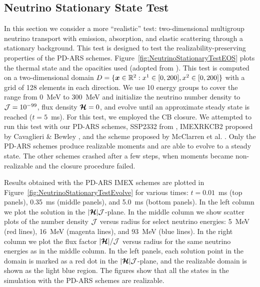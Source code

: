 \subsection{Neutrino Stationary State Test} \label{se: Neutrino Stationary State Test}

In this section we consider a more ``realistic'' test: two-dimensional multigroup neutrino transport with emission, absorption, and elastic scattering through a stationary background.  
This test is designed to test the realizability-preserving properties of the PD-ARS schemes.  
Figure~\ref{fig:NeutrinoStationaryTestEOS} plots the thermal state and the opacities used (adopted from \cite{Bruenn_1985}).  
This test is computed on a two-dimensional domain $D=\{\boldsymbol{x}\in\mathbb{R}^{2}:x^{1}\in[0,200], x^{2}\in[0,200]\}$ with a grid of 128 elements in each direction.  
We use 10 energy groups to cover the range from 0~MeV to 300~MeV and initialize the neutrino number density to $\mathcal{J} = 10^{-99}$, flux density $\boldsymbol{\mathcal{H}}=0$, and evolve until an approximate steady state is reached ($t=5$~ms).  
For this test, we employed the CB closure.  
We attempted to run this test with our PD-ARS schemes, SSP2332 from \cite{pareschiRusso_2005}, IMEXRKCB2 proposed by Cavaglieri \& Bewley \cite{cavaglieriBewley2015}, and the scheme proposed by McClarren et al. \cite{mcclarren_etal_2008}.
Only the PD-ARS schemes produce realizable moments and are able to evolve to a steady state.
The other schemes crashed after a few steps, when moments became non-realizable and the closure procedure failed.  

Results obtained with the PD-ARS IMEX schemes are plotted in Figure~\ref{fig:NeutrinoStationaryTestEvolve} for various times: $t=0.01$~ms (top panels), 0.35~ms (middle panels), and 5.0~ms (bottom panels).  
In the left column we plot the solution in the $|\boldsymbol{\mathcal{H}}|\mathcal{J}$-plane.  
In the middle column we show scatter plots of the number density $\mathcal{J}$ versus radius for select neutrino energies: 5~MeV (red lines), 16~MeV (magenta lines), and $93$~MeV (blue lines).  
In the right column we plot the flux factor $|\boldsymbol{\mathcal{H}}|/\mathcal{J}$ versus radius for the same neutrino energies as in the middle column.  
In the left panels, each solution point in the domain is marked as a red dot in the $|\boldsymbol{\mathcal{H}}|\mathcal{J}$-plane, and the realizable domain is shown as the light blue region.  
The figures show that all the states in the simulation with the PD-ARS schemes are realizable.  


